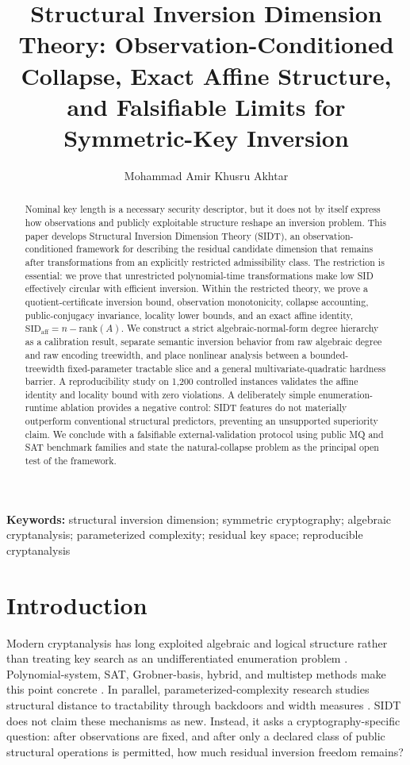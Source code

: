 \documentclass[11pt]{article}
\title{Structural Inversion Dimension Theory: Observation-Conditioned Collapse, Exact Affine Structure, and Falsifiable Limits for Symmetric-Key Inversion}
\author{Mohammad Amir Khusru Akhtar}
\date{}
\begin{document}
\maketitle
\begin{abstract}
Nominal key length is a necessary security descriptor, but it does not by itself express how observations and publicly exploitable structure reshape an inversion problem. This paper develops Structural Inversion Dimension Theory (SIDT), an observation-conditioned framework for describing the residual candidate dimension that remains after transformations from an explicitly restricted admissibility class. The restriction is essential: we prove that unrestricted polynomial-time transformations make low SID effectively circular with efficient inversion. Within the restricted theory, we prove a quotient-certificate inversion bound, observation monotonicity, collapse accounting, public-conjugacy invariance, locality lower bounds, and an exact affine identity, $\mathrm{SID}_{\mathrm{aff}}=n-\mathrm{rank}(A)$. We construct a strict algebraic-normal-form degree hierarchy as a calibration result, separate semantic inversion behavior from raw algebraic degree and raw encoding treewidth, and place nonlinear analysis between a bounded-treewidth fixed-parameter tractable slice and a general multivariate-quadratic hardness barrier. A reproducibility study on 1,200 controlled instances validates the affine identity and locality bound with zero violations. A deliberately simple enumeration-runtime ablation provides a negative control: SIDT features do not materially outperform conventional structural predictors, preventing an unsupported superiority claim. We conclude with a falsifiable external-validation protocol using public MQ and SAT benchmark families and state the natural-collapse problem as the principal open test of the framework.
\end{abstract}
\noindent\textbf{Keywords:} structural inversion dimension; symmetric cryptography; algebraic cryptanalysis; parameterized complexity; residual key space; reproducible cryptanalysis

\section{Introduction}
Modern cryptanalysis has long exploited algebraic and logical structure rather than treating key search as an undifferentiated enumeration problem \parencite{shannon1949,bard2009,massacci2000,lascala2025}. Polynomial-system, SAT, Grobner-basis, hybrid, and multistep methods make this point concrete \parencite{bettale2009,bettale2012,lascala2022,lascala2024}. In parallel, parameterized-complexity research studies structural distance to tractability through backdoors and width measures \parencite{gaspers2017csp,gaspers2017hetero,dreier2024,gasper2026}. SIDT does not claim these mechanisms as new. Instead, it asks a cryptography-specific question: after observations are fixed, and after only a declared class of public structural operations is permitted, how much residual inversion freedom remains?
\end{document}
